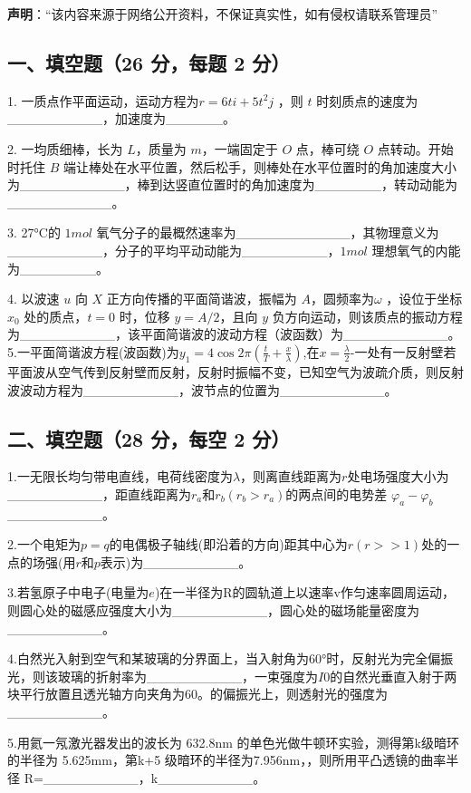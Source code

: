 
\textbf{声明}：“该内容来源于网络公开资料，不保证真实性，如有侵权请联系管理员”

\subsection{一、填空题（26 分，每题 2 分）}
1. 一质点作平面运动，运动方程为$r=6ti+5t^2j$ ，则 $t$ 时刻质点的速度为__________，加速度为______。

2. 一均质细棒，长为 $L$，质量为 $m$，一端固定于 $O$ 点，棒可绕 $O$ 点转动。开始时托住 $B$ 端让棒处在水平位置，然后松手，则棒处在水平位置时的角加速度大小为___________，棒到达竖直位置时的角加速度为_______，转动动能为___________。

3. 27°C的 $1mol$ 氧气分子的最概然速率为____________，其物理意义为__________，分子的平均平动动能为_________，$1mol$ 理想氧气的内能为________。

4. 以波速 $u$ 向 $X$ 正方向传播的平面简谐波，振幅为 $A$，圆频率为$\omega$ ，设位于坐标 $x_0$ 处的质点，$t=0$ 时，位移 $y=A/2$，且向 $y$ 负方向运动，则该质点的振动方程为__________，该平面简谐波的波动方程（波函数）为___________。
5.一平面简谐波方程(波函数)为$y_1=4\cos2\pi(\frac{t}{T}+\frac{x}{\lambda})$,在$x=\frac{\lambda}{2}$-一处有一反射壁若平面波从空气传到反射壁而反射，反射时振幅不变，已知空气为波疏介质，则反射波波动方程为__________，波节点的位置为___________。
\subsection{二、填空题（28 分，每空 2 分）}
1.一无限长均匀带电直线，电荷线密度为$\lambda$，则离直线距离为$r$处电场强度大小为__________，距直线距离为$r_a$和$r_b(r_b>r_a)$的两点间的电势差 $\varphi_a-\varphi_b$__________。

2.一个电矩为$p=q$的电偶极子轴线(即沿着的方向)距其中心为$r(r>>1)$处的一点的场强(用$r$和$p$表示)为__________。

3.若氢原子中电子(电量为$e$)在一半径为R的圆轨道上以速率v作匀速率圆周运动，则圆心处的磁感应强度大小为__________，圆心处的磁场能量密度为__________。

4.白然光入射到空气和某玻璃的分界面上，当入射角为60°时，反射光为完全偏振光，则该玻璃的折射率为__________，一束强度为$I0$的自然光垂直入射于两块平行放置且透光轴方向夹角为60。的偏振光上，则透射光的强度为__________。

5.用氦一氖激光器发出的波长为 632.8nm 的单色光做牛顿环实验，测得第k级暗环的半径为 5.625mm，第k+5 级暗环的半径为7.956nm，，则所用平凸透镜的曲率半径 R=__________，k__________。